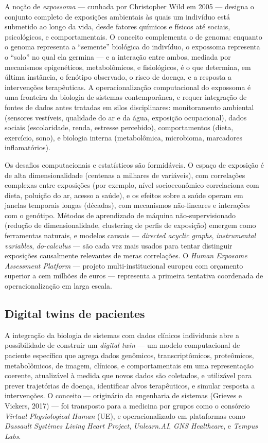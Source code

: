 A noção de \emph{expossoma} --- cunhada por Christopher Wild em 2005 --- designa o conjunto completo de exposições ambientais às quais um indivíduo está submetido ao longo da vida, desde fatores químicos e físicos até sociais, psicológicos, e comportamentais. O conceito complementa o de genoma: enquanto o genoma representa a ``semente'' biológica do indivíduo, o expossoma representa o ``solo'' no qual ela germina --- e a interação entre ambos, mediada por mecanismos epigenéticos, metabolômicos, e fisiológicos, é o que determina, em última instância, o fenótipo observado, o risco de doença, e a resposta a intervenções terapêuticas. A operacionalização computacional do expossoma é uma fronteira da biologia de sistemas contemporânea, e requer integração de fontes de dados antes tratadas em silos disciplinares: monitoramento ambiental (sensores vestíveis, qualidade do ar e da água, exposição ocupacional), dados sociais (escolaridade, renda, estresse percebido), comportamentos (dieta, exercício, sono), e biologia interna (metabolômica, microbioma, marcadores inflamatórios).

Os desafios computacionais e estatísticos são formidáveis. O espaço de exposição é de alta dimensionalidade (centenas a milhares de variáveis), com correlações complexas entre exposições (por exemplo, nível socioeconômico correlaciona com dieta, poluição do ar, acesso a saúde), e os efeitos sobre a saúde operam em janelas temporais longas (décadas), com mecanismos não-lineares e interações com o genótipo. Métodos de aprendizado de máquina não-supervisionado (redução de dimensionalidade, clustering de perfis de exposição) emergem como ferramentas naturais, e modelos causais --- \emph{directed acyclic graphs}, \emph{instrumental variables}, \emph{do-calculus} --- são cada vez mais usados para tentar distinguir exposições causalmente relevantes de meras correlações. O \emph{Human Exposome Assessment Platform} --- projeto multi-institucional europeu com orçamento superior a cem milhões de euros --- representa a primeira tentativa coordenada de operacionalização em larga escala.

\subsection{Digital twins de pacientes}
\label{sec:15-digitaltwins}

A integração da biologia de sistemas com dados clínicos individuais abre a possibilidade de construir um \emph{digital twin} --- um modelo computacional de paciente específico que agrega dados genômicos, transcriptômicos, proteômicos, metabolômicos, de imagem, clínicos, e comportamentais em uma representação coerente, atualizável à medida que novos dados são coletados, e utilizável para prever trajetórias de doença, identificar alvos terapêuticos, e simular resposta a intervenções. O conceito --- originário da engenharia de sistemas (Grieves e Vickers, 2017) --- foi transposto para a medicina por grupos como o consórcio \emph{Virtual Physiological Human} (UE), e operacionalizado em plataformas como \emph{Dassault Systèmes Living Heart Project}, \emph{Unlearn.AI}, \emph{GNS Healthcare}, e \emph{Tempus Labs}.

